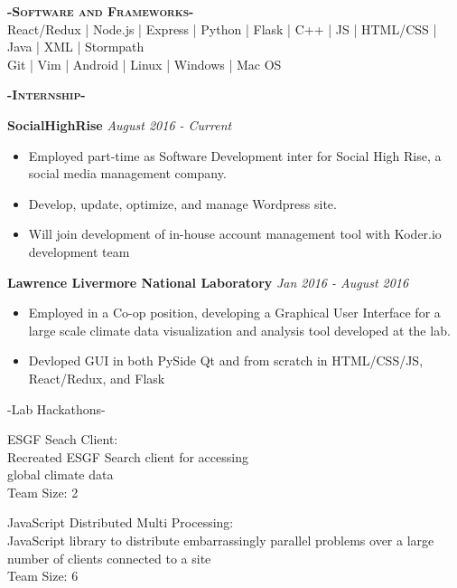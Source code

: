 \documentclass[12pt]{article}
\begin{document}
\center
\color{black}
\textbf{\textsc{-Software and Frameworks-}}\\
\medskip
\color{Cerulean}React/Redux | Node.js  | Express | Python | Flask  | C++ | JS | HTML/CSS | Java | XML | Stormpath\color{gray}\\
\smallskip
Git | Vim | Android | Linux | Windows | Mac OS\\
\color{black}
\begin{center}
\textbf{\textsc{-Internship-}}\\
\end{center}
\begin{footnotesize}
\flushleft
\color{Cerulean}\textbf{SocialHighRise} \color{black}\hfill\textit{August 2016 - Current}
\color{black}
\begin{itemize}
    \setlength{\itemsep}{0pt}
	\item Employed part-time as Software Development inter for Social High Rise, a social media management company.
	\item Develop, update, optimize, and manage Wordpress site.
	\item Will join development of in-house account management tool with Koder.io development team
\end{itemize}
\color{Cerulean}\textbf{Lawrence Livermore National Laboratory} \color{Black} \hfill \textit{Jan 2016 - August 2016} 
\color{Black}
\begin{itemize}
    \setlength{\itemsep}{0pt}
	\item Employed in a Co-op position, developing a Graphical User Interface for a large scale climate data visualization and analysis tool developed at the lab.
	\item Devloped GUI in both PySide Qt and from scratch in HTML/CSS/JS, React/Redux, and Flask
\
\end{itemize}

\center
-Lab Hackathons-
\begin{multicols}{2}
\center
\color{Cerulean}ESGF Seach Client:\\ \color{black}
Recreated ESGF Search client for accessing\\
global climate data\\
Team Size: 2

\columnbreak

\color{Cerulean}JavaScript Distributed Multi Processing:\\ \color{black}
JavaScript library to distribute embarrassingly parallel problems over a large number of clients connected to a site\\
Team Size: 6


\end{multicols}
\medskip

\end{footnotesize}
\end{document}
